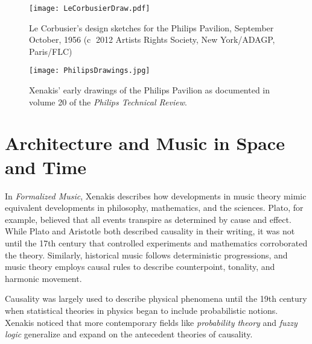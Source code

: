 \begin{figure*}[]
  \texttt{[image: LeCorbusierDraw.pdf]}
  \caption{Le Corbusier's design sketches for the Philips Pavilion,
    September \textendash{} October, 1956 (\textcircled{c} 2012
    Artists Rights Society, New York/ADAGP, Paris/FLC)}
  \label{fig:le-corbusier-sketch}
\end{figure*}

\begin{figure*}[h]
  \texttt{[image: PhilipsDrawings.jpg]}
  \caption{Xenakis' early drawings of the Philips Pavilion as
    documented in volume 20 of the \textit{Philips Technical Review}.}
  \label{fig:xenakis-draw}
\end{figure*}

\section{Architecture and Music in Space and Time}
\label{sec:introduction-conclusion}

In \textit{Formalized Music}\cite{xenakis1992formalized}, Xenakis
describes how developments in music theory mimic equivalent
developments in philosophy, mathematics, and the sciences. Plato, for
example, believed that all events transpire as determined by cause and
effect. While Plato and Aristotle both described causality in their
writing, it was not until the 17th century that controlled experiments
and mathematics corroborated the theory.
Similarly, historical music follows deterministic progressions, and
music theory employs causal rules to describe counterpoint, tonality,
and harmonic movement.

Causality was largely used to describe physical phenomena until the
19th century when statistical theories in physics began to include
probabilistic notions. Xenakis
noticed that more contemporary fields like \emph{probability theory}
and \emph{fuzzy logic} generalize and expand on the antecedent
theories of causality.

